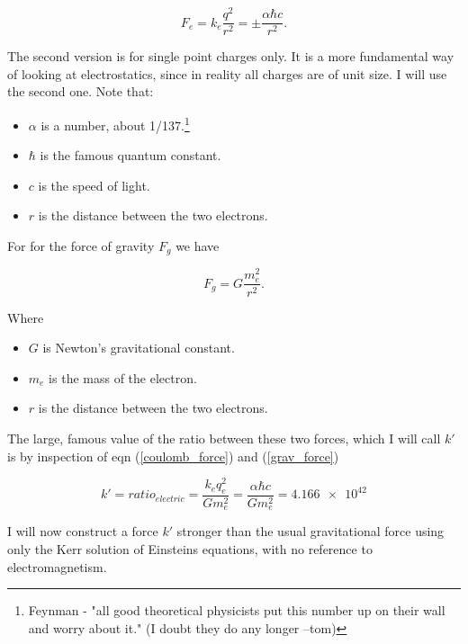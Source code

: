 \documentclass[../rzero]{subfiles}
\begin{document}
\begin{equation}\label{coulomb_force}
	F_e = k_e\frac{q^2}{r^2} = \pm \frac{\alpha \hbar c}{r^2}.
\end{equation}

The second version is for single point charges only. It is a more fundamental way of looking at electrostatics, since in reality all charges are of unit size. I will use the second one. Note that:

\begin{itemize}
  \item $\alpha$ is a number, about 1/137.\footnote{Feynman - "all good theoretical physicists put this number up on their wall and worry about it." (I doubt they do any longer --tom) }
  \item $\hbar$ is the famous quantum constant.
  \item $c$ is the speed of light.
  \item $r$ is the distance between the two electrons.
\end{itemize}

For for the force of gravity $F_g$ we have

\begin{equation} \label{grav_force}
	F_g = G\frac{m_e^2}{r^2}.
\end{equation}

Where

\begin{itemize}
  \item $G$ is Newton's gravitational constant.
  \item $m_e$ is the mass of the electron.
  \item $r$ is the distance between the two electrons.
\end{itemize}

The large, famous value of the ratio between these two forces, which I will call $k'$ is by inspection of eqn (\ref{coulomb_force}) and (\ref{grav_force})

\begin{equation} \label{electric_ratio}
	k' = ratio_{electric} = \frac{k_e q_e^2}{G m_e^2} = \frac{\alpha \hbar c}{G m_e^2} = \num{4.166e42}
\end{equation}


I will now construct a force $k'$ stronger than the usual gravitational force using only the Kerr solution of Einsteins equations, with no reference to electromagnetism.
\end{document}
